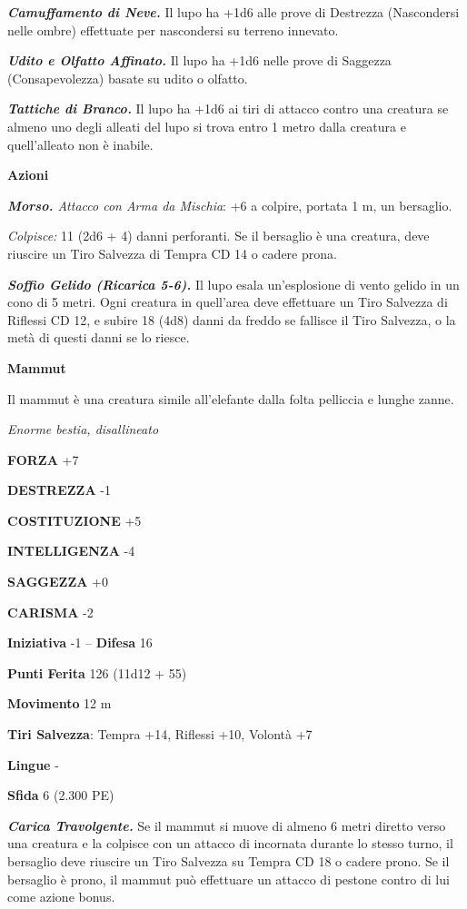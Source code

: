 \begin{multicols}{2}
\emph{\textbf{Camuffamento di Neve.}} Il lupo ha +1d6 alle prove di Destrezza (Nascondersi nelle ombre) effettuate per nascondersi su terreno innevato.

\emph{\textbf{Udito e Olfatto Affinato.}} Il lupo ha +1d6 nelle prove di Saggezza (Consapevolezza) basate su udito o olfatto.

\emph{\textbf{Tattiche di Branco.}} Il lupo ha +1d6 ai tiri di attacco contro una creatura se almeno uno degli alleati del lupo si trova entro 1 metro dalla creatura e quell'alleato non è inabile.

\textbf{Azioni}

\emph{\textbf{Morso.} Attacco con Arma da Mischia}: +6 a colpire, portata 1 m, un bersaglio.

\emph{Colpisce:} 11 (2d6 + 4) danni perforanti. Se il bersaglio è una creatura, deve riuscire un Tiro Salvezza di Tempra CD 14 o cadere prona.

\emph{\textbf{Soffio Gelido (Ricarica 5-6).}} Il lupo esala un'esplosione di vento gelido in un cono di 5 metri. Ogni creatura in quell'area deve effettuare un Tiro Salvezza di Riflessi CD 12, e subire 18 (4d8) danni da freddo se fallisce il Tiro Salvezza, o la metà di questi danni se lo riesce.

\medskip\textbf{Mammut}

Il mammut è una creatura simile all'elefante dalla folta pelliccia e lunghe zanne.

\emph{Enorme bestia, disallineato}

\textbf{FORZA} +7

\textbf{DESTREZZA} -1

\textbf{COSTITUZIONE} +5

\textbf{INTELLIGENZA} -4

\textbf{SAGGEZZA} +0

\textbf{CARISMA} -2

\textbf{Iniziativa} -1 -- \textbf{Difesa} 16

\textbf{Punti Ferita} 126 (11d12 + 55)

\textbf{Movimento} 12 m

\textbf{Tiri Salvezza}: Tempra +14, Riflessi +10, Volontà +7 

\textbf{Lingue} -

\textbf{Sfida} 6 (2.300 PE)

\emph{\textbf{Carica Travolgente.}} Se il mammut si muove di almeno 6 metri diretto verso una creatura e la colpisce con un attacco di incornata durante lo stesso turno, il bersaglio deve riuscire un Tiro Salvezza su Tempra CD 18 o cadere prono. Se il bersaglio è prono, il mammut può effettuare un attacco di pestone contro di lui come azione bonus.


\end{multicols}
